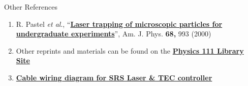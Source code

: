 \documentclass{../lab}
\begin{document}
Other References

\begin{enumerate}
    \item R. Pastel \emph{et al}., ``\href{http://physics111.lib.berkeley.edu/Physics111/Reprints/OTZ/Build-Optical-Trap-3.pdf}{\textbf{Laser trapping of microscopic particles for undergraduate experiments}}'', Am. J. Phys. \textbf{68,} 993 (2000)

    \item Other reprints and materials can be found on the \href{http://physics111.lib.berkeley.edu/Physics111/Reprints/OTZ/OTZ\_index.html}{\textbf{Physics 111 Library Site}}

    \item \href{http://experimentationlab.berkeley.edu/sites/default/files/images/Cable\_Diagram\_Laser\_TEC.pdf}{\textbf{Cable wiring diagram for SRS Laser \& TEC controller}}
\end{enumerate}
\end{document}
